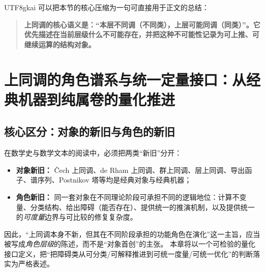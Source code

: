 \documentclass[12pt]{article}
\begin{document}
\begin{CJK*}{UTF8}{gkai}
可以把本节的核心压缩为一句可直接用于正文的总结：
\begin{quote}
\textbf{上同调的核心语义是：“本层不同调（不同类），上层可能同调（同类）”。它优先描述在当前层级什么不可能存在，并把这种不可能性记录为可上推、可继续运算的结构对象。}
\end{quote}


\section{上同调的角色谱系与统一定量接口：从经典机器到纯属卷的量化推进}

\subsection{核心区分：对象的新旧与角色的新旧}

在数学史与数学文本的阅读中，必须把两类“新旧”分开：
\begin{itemize}
  \item \textbf{对象新旧：} \v{C}ech 上同调、de Rham 上同调、群上同调、层上同调、导出函子、谱序列、Postnikov 塔等均是经典对象与经典机器；
  \item \textbf{角色新旧：} 同一套对象在不同理论阶段可承担不同的逻辑地位：计算不变量、分类结构、给出障碍（能否存在）、提供统一的推演机制，以及提供统一的\emph{可度量}边界与可比较的修复复杂度。
\end{itemize}

因此，“上同调本身不新，但其在不同阶段承担的功能角色在演化”这一主旨，应当被写成\emph{角色层级}的陈述，而不是“对象首创”的主张。
本章将以一个可检验的量化接口定义，把“把障碍类从可分类/可解释推进到可统一度量/可统一优化”的判断落实为严格表述。


\end{CJK*}
\end{document}
